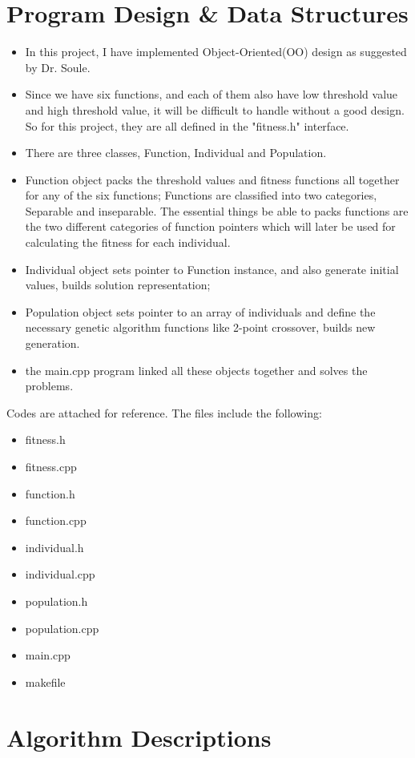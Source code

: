 \documentclass[b5paper,11pt, abstraction, titlepage]{scrartcl}
\begin{document}
\begin{CJK}{UTF8}{gbsn}
\section{Program Design \& Data Structures}
\begin{itemize}
  \itemsep=-3pt
\item In this project, I have implemented Object-Oriented(OO) design as suggested by Dr. Soule. 
\item Since we have six functions, and each of them also have low threshold value and high threshold value, it will be difficult to handle without a good design. So for this project, they are all defined in the "fitness.h" interface.
\item There are three classes, Function, Individual and Population.
\item Function object packs the threshold values and fitness functions all together for any of the six functions; Functions are classified into two categories, Separable and inseparable. The essential things be able to packs functions are the two different categories of function pointers which will later be used for calculating the fitness for each individual.
\item Individual object sets pointer to Function instance, and also generate initial values, builds solution representation;
\item Population object sets pointer to an array of individuals and define the necessary genetic algorithm functions like 2-point crossover, builds new generation.
\item the main.cpp program linked all these objects together and solves the problems.
\end{itemize}
Codes are attached for reference. The files include the following:
\begin{itemize}
  \itemsep=-3pt
\item  fitness.h
\item  fitness.cpp
\item  function.h
\item  function.cpp
\item  individual.h
\item  individual.cpp
\item  population.h
\item  population.cpp
\item  main.cpp
\item  makefile
\end{itemize}

\section{Algorithm Descriptions}


\end{CJK}
\end{document}
